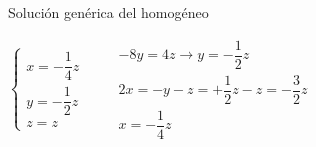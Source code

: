 \begin{enumerate}[label=\color{red}\textbf{\arabic*)},leftmargin=*]
Solución genérica del homogéneo

$\begin{cases}
	x=-\dfrac{1}{4}z\\
	y=-\dfrac{1}{2}z\\
	z=z
\end{cases}\qquad\begin{array}{l}
-8y=4z\to y=-\dfrac{1}{2}z\\
2x=-y-z=+\dfrac{1}{2}z-z=-\dfrac{3}{2}z\\
x=-\dfrac{1}{4}z
\end{array}$
\end{enumerate}